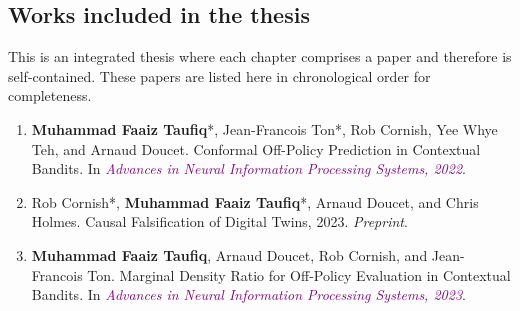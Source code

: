 \subsection{Works included in the thesis}
This is an integrated thesis where each chapter comprises a paper and therefore is self-contained.
These papers are listed here in chronological order for completeness.
\begin{enumerate}
    \item \textbf{Muhammad Faaiz Taufiq}*, Jean-Francois Ton*, Rob Cornish, Yee Whye Teh, and Arnaud Doucet.
    Conformal Off-Policy Prediction in Contextual Bandits. In \textit{\textcolor{purple}{Advances in Neural Information Processing
    Systems, 2022}}. \citep{taufiq2022conformal}
    \item Rob Cornish*, \textbf{Muhammad Faaiz Taufiq}*, Arnaud Doucet, and Chris Holmes. Causal Falsification
    of Digital Twins, 2023. \textit{Preprint}. \citep{cornish2023causalfalsificationdigitaltwins}
    \item \textbf{Muhammad Faaiz Taufiq}, Arnaud Doucet, Rob Cornish, and Jean-Francois Ton. Marginal Density Ratio for Off-Policy Evaluation in Contextual Bandits. In 
    \textit{\textcolor{purple}{Advances in Neural Information Processing Systems, 2023}}. \citep{taufiq2023marginal}
\end{enumerate}


